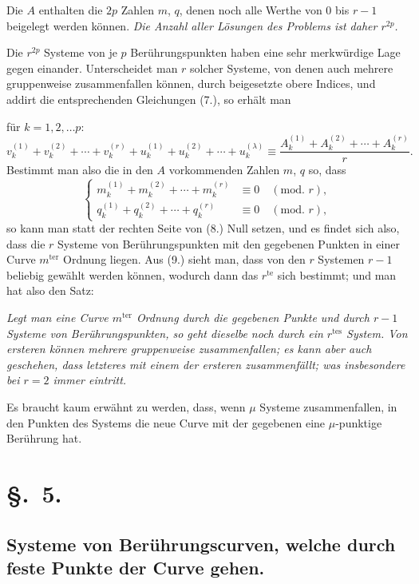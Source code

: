\documentclass{article}
\begin{document}
Die $A$ enthalten die $2p$ Zahlen $m$, $q$, denen noch alle Werthe von 0 bis $r-1$ beigelegt werden können. \emph{Die Anzahl aller Lösungen des Problems ist daher $r^{2p}$.}

Die $r^{2p}$ Systeme von je $p$ Berührungspunkten haben eine sehr merkwürdige Lage gegen einander. Unterscheidet man $r$ solcher Systeme, von denen auch mehrere gruppenweise zusammenfallen können, durch beigesetzte obere Indices, und addirt die entsprechenden Gleichungen (7.), so erhält man

für $k = 1, 2, \ldots p$:
\[ v_{k}^{(1)} + v_{k}^{(2)} + \cdots + v_{k}^{(r)} + u_{k}^{(1)} + u_{k}^{(2)} + \cdots + u_{k}^{(\lambda)} \equiv \frac{A_{k}^{(1)} + A_{k}^{(2)} + \cdots + A_{k}^{(r)}}{r}. \tag{8.} \]
Bestimmt man also die in den $A$ vorkommenden Zahlen $m$, $q$ so, dass
\[
\left\{
\begin{aligned}
m_{k}^{(1)} + m_{k}^{(2)} + \cdots + m_{k}^{(r)} &\equiv 0 \quad (\text{mod. } r), \\
q_{k}^{(1)} + q_{k}^{(2)} + \cdots + q_{k}^{(r)} &\equiv 0 \quad (\text{mod. } r),
\end{aligned}
\right.
\tag{9.}
\]
so kann man statt der rechten Seite von (8.) Null setzen, und es findet sich also, dass die $r$ Systeme von Berührungspunkten mit den gegebenen Punkten in einer Curve $m^{\text{ter}}$ Ordnung liegen. Aus (9.) sieht man, dass von den $r$ Systemen $r-1$ beliebig gewählt werden können, wodurch dann das $r^{\text{te}}$ sich bestimmt; und man hat also den Satz:

\emph{Legt man eine Curve $m^{\text{ter}}$ Ordnung durch die gegebenen Punkte und durch $r-1$ Systeme von Berührungspunkten, so geht dieselbe noch durch ein $r^{\text{tes}}$ System. Von ersteren können mehrere gruppenweise zusammenfallen; es kann aber auch geschehen, dass letzteres mit einem der ersteren zusammenfällt; was insbesondere bei $r = 2$ immer eintritt.}

Es braucht kaum erwähnt zu werden, dass, wenn $\mu$ Systeme zusammenfallen, in den Punkten des Systems die neue Curve mit der gegebenen eine $\mu$-punktige Berührung hat.

\section*{§.~5.}
\subsection*{Systeme von Berührungscurven, welche durch feste Punkte der Curve gehen.}
\end{document}
